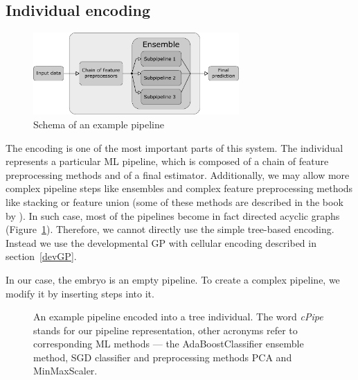 \subsection{Individual encoding} \label{sec:encoding}
\begin{figure}[ht]\centering
\includegraphics[width=0.7\textwidth]{../img/pipeline-pdfa.pdf}
\caption{Schema of an example pipeline}
\label{pic02:pipeline}
\end{figure}

The encoding is one of the most important parts of this system. The individual
represents a particular ML pipeline, which is composed of a chain of feature
preprocessing methods and of a final estimator. Additionally, we may allow
more complex pipeline steps like ensembles and complex feature
preprocessing methods like stacking or feature union (some of these methods are
described in the book by \cite{Brazdil:2008:MAD:1507541}). In such case, most of the
pipelines become in fact directed acyclic graphs (Figure~\ref{pic02:pipeline}).
Therefore, we cannot directly use the simple tree-based encoding. Instead we
use the developmental GP with cellular encoding described
in section~\ref{devGP}.

In our case, the embryo is an empty pipeline. To create a complex pipeline, we
modify it by inserting steps into it.

\begin{figure}[ht]\centering
    \qquad
    \caption[An example pipeline encoded into a tree individual]{
    An example pipeline encoded into a tree individual. The word \emph{cPipe}
    stands for our pipeline representation, other acronyms refer to
    corresponding ML methods --- the AdaBoostClassifier ensemble method,
    SGD classifier and preprocessing methods PCA and MinMaxScaler.
    }%
    \label{pic:pipeencoding}%
\end{figure}

